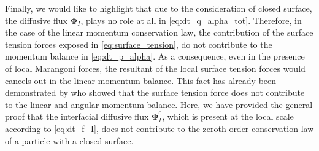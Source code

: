 

Finally, we would like to highlight that  due to the consideration of closed surface, the diffusive flux $\mathbf{\Phi}_I$, plays no role at all in \ref{eq:dt_q_alpha_tot}.
Therefore, in the case of the linear momentum conservation law, the contribution of the surface tension forces exposed in \ref{eq:surface_tension}, do not contribute to the momentum balance in \ref{eq:dt_p_alpha}.
As a consequence, even in the presence of local Marangoni forces, the resultant of the local surface tension forces would cancels out in the linear momentum balance.
This fact has already been demonstrated by \citet{hesla1993note} who showed that the surface tension force does not contribute to the linear and angular momentum balance. 
Here, we have provided the general proof that the interfacial diffusive flux $\mathbf{\Phi}_I^0$, which is present at the local scale according to \ref{eq:dt_f_I}, does not contribute to the zeroth-order conservation law of a particle with a closed surface.

